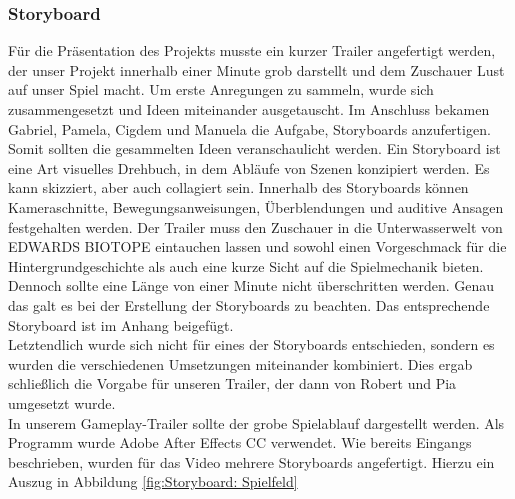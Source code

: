 \subsubsection{Storyboard}
Für die Präsentation des Projekts musste ein kurzer Trailer angefertigt werden, der unser Projekt innerhalb einer Minute grob darstellt und dem Zuschauer Lust auf unser Spiel macht. Um erste Anregungen zu sammeln, wurde sich zusammengesetzt und Ideen miteinander ausgetauscht. Im Anschluss bekamen Gabriel, Pamela, Cigdem und Manuela die Aufgabe, Storyboards anzufertigen. Somit sollten die gesammelten Ideen veranschaulicht werden.
Ein Storyboard ist eine Art visuelles Drehbuch, in dem Abläufe von Szenen konzipiert werden. Es kann skizziert, aber auch collagiert sein. Innerhalb des Storyboards können Kameraschnitte, Bewegungsanweisungen, Überblendungen und auditive Ansagen festgehalten werden.
Der Trailer muss den Zuschauer in die Unterwasserwelt von EDWARDS BIOTOPE eintauchen lassen und sowohl einen Vorgeschmack für die Hintergrundgeschichte als auch eine kurze Sicht auf die Spielmechanik bieten. Dennoch sollte eine Länge von einer Minute nicht überschritten werden. Genau das galt es bei der Erstellung der Storyboards zu beachten. Das entsprechende Storyboard ist im Anhang beigefügt. \\Letztendlich wurde sich nicht für eines der Storyboards entschieden, sondern es wurden die verschiedenen Umsetzungen miteinander kombiniert. Dies ergab schließlich die Vorgabe für unseren Trailer, der dann von Robert und Pia umgesetzt wurde. \\
In unserem Gameplay-Trailer sollte der grobe Spielablauf dargestellt werden. Als Programm wurde Adobe After Effects CC verwendet.
Wie bereits Eingangs beschrieben, wurden für das Video mehrere Storyboards angefertigt. Hierzu ein Auszug in Abbildung \ref{fig:Storyboard: Spielfeld}

